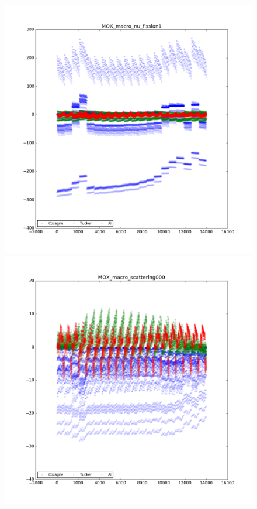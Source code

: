 \begin{center}
\begin{figure}[h]
\begin{minipage}[b]{0.5\linewidth}
   \end{minipage}
   \begin{minipage}[b]{0.5\linewidth}
      \centering \includegraphics[scale=0.3]{images/MOX/MOX_macro_nu_fission1.png}
   \end{minipage}
	 \begin{minipage}[b]{0.5\linewidth}
      \centering \includegraphics[scale=0.3]{images/MOX/MOX_macro_scattering000.png}

\end{minipage}
\end{figure}
\end{center}
